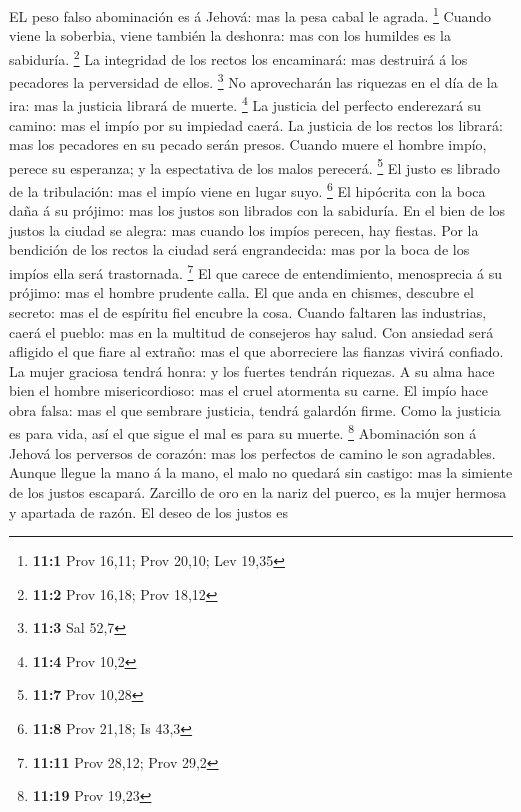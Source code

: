  EL peso falso abominación es á Jehová: mas la pesa cabal le
agrada. \footnote{\textbf{11:1} Prov 16,11; Prov 20,10; Lev 19,35}
 Cuando viene la soberbia, viene también la deshonra: mas
con los humildes es la sabiduría. \footnote{\textbf{11:2} Prov 16,18;
  Prov 18,12}  La integridad de los rectos los encaminará:
mas destruirá á los pecadores la perversidad de ellos. \footnote{\textbf{11:3}
  Sal 52,7}  No aprovecharán las riquezas en el día de la
ira: mas la justicia librará de muerte. \footnote{\textbf{11:4} Prov
  10,2}  La justicia del perfecto enderezará su camino: mas
el impío por su impiedad caerá.  La justicia de los rectos
los librará: mas los pecadores en su pecado serán presos. 
Cuando muere el hombre impío, perece su esperanza; y la espectativa de
los malos perecerá. \footnote{\textbf{11:7} Prov 10,28}  El
justo es librado de la tribulación: mas el impío viene en lugar suyo.
\footnote{\textbf{11:8} Prov 21,18; Is 43,3}  El hipócrita
con la boca daña á su prójimo: mas los justos son librados con la
sabiduría.  En el bien de los justos la ciudad se alegra:
mas cuando los impíos perecen, hay fiestas.  Por la
bendición de los rectos la ciudad será engrandecida: mas por la boca de
los impíos ella será trastornada. \footnote{\textbf{11:11} Prov 28,12;
  Prov 29,2}  El que carece de entendimiento, menosprecia á
su prójimo: mas el hombre prudente calla.  El que anda en
chismes, descubre el secreto: mas el de espíritu fiel encubre la cosa.
 Cuando faltaren las industrias, caerá el pueblo: mas en la
multitud de consejeros hay salud.  Con ansiedad será
afligido el que fiare al extraño: mas el que aborreciere las fianzas
vivirá confiado.  La mujer graciosa tendrá honra: y los
fuertes tendrán riquezas.  A su alma hace bien el hombre
misericordioso: mas el cruel atormenta su carne.  El impío
hace obra falsa: mas el que sembrare justicia, tendrá galardón firme.
 Como la justicia es para vida, así el que sigue el mal es
para su muerte. \footnote{\textbf{11:19} Prov 19,23} 
Abominación son á Jehová los perversos de corazón: mas los perfectos de
camino le son agradables.  Aunque llegue la mano á la mano,
el malo no quedará sin castigo: mas la simiente de los justos escapará.
 Zarcillo de oro en la nariz del puerco, es la mujer
hermosa y apartada de razón.  El deseo de los justos es
